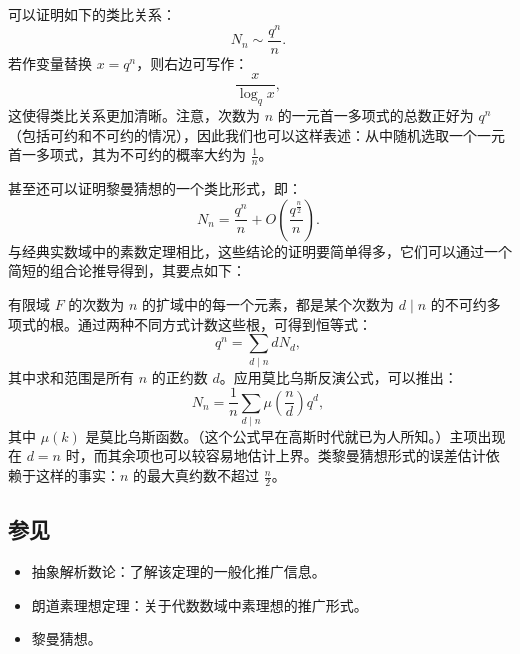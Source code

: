 可以证明如下的类比关系：
$$
N_n \sim \frac{q^n}{n}.~
$$
若作变量替换 $x = q^n$，则右边可写作：
$$
\frac{x}{\log_q x},~
$$
这使得类比关系更加清晰。注意，次数为 $n$ 的一元首一多项式的总数正好为 $q^n$（包括可约和不可约的情况），因此我们也可以这样表述：从中随机选取一个一元首一多项式，其为不可约的概率大约为 $\frac{1}{n}$。

甚至还可以证明黎曼猜想的一个类比形式，即：
$$
N_n = \frac{q^n}{n} + O\left(\frac{q^{\frac{n}{2}}}{n}\right).~
$$
与经典实数域中的素数定理相比，这些结论的证明要简单得多，它们可以通过一个简短的组合论推导得到，其要点如下：

有限域 $F$ 的次数为 $n$ 的扩域中的每一个元素，都是某个次数为 $d \mid n$ 的不可约多项式的根。通过两种不同方式计数这些根，可得到恒等式：
$$
q^n = \sum_{d \mid n} d N_d,~
$$
其中求和范围是所有 $n$ 的正约数 $d$。应用莫比乌斯反演公式，可以推出：
$$
N_n = \frac{1}{n} \sum_{d \mid n} \mu\left(\frac{n}{d}\right) q^d,~
$$
其中 $\mu(k)$ 是莫比乌斯函数。（这个公式早在高斯时代就已为人所知。）主项出现在 $d = n$ 时，而其余项也可以较容易地估计上界。类黎曼猜想形式的误差估计依赖于这样的事实：$n$ 的最大真约数不超过 $\frac{n}{2}$。
\subsection{参见}
\begin{itemize}
\item 抽象解析数论：了解该定理的一般化推广信息。
\item 朗道素理想定理：关于代数数域中素理想的推广形式。
\item 黎曼猜想。
\end{itemize}
